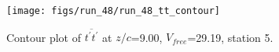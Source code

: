 \begin{figure}[H]
\centering
\texttt{[image: figs/run\_48/run\_48\_tt\_contour]}
\caption{Contour plot of $\overline{t^\prime t^\prime}$ at $z/c$=9.00, $V_{free}$=29.19, station 5.}
\label{fig:run_48_tt_contour}
\end{figure}


